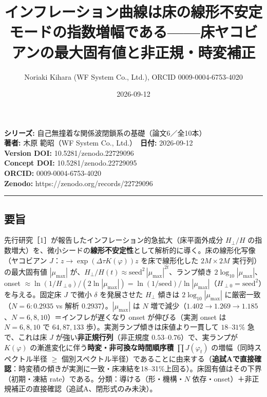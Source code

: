 \documentclass[
  a4paper,
]{ltjsarticle}
\title{インフレーション曲線は床の線形不安定モードの指数増幅である------床ヤコビアンの最大固有値と非正規・時変補正}
\author{Noriaki Kihara (WF System Co., Ltd.), ORCID 0009-0004-6753-4020}
\date{2026-09-12}
\begin{document}
\maketitle

\textbf{シリーズ:} 自己無撞着な関係波閉鎖系の基礎（論文6／全10本）\\
\textbf{著者:} 木原 範昭（WF System Co., Ltd.）　\textbf{日付:}
2026-09-12\\
\textbf{Version DOI:} 10.5281/zenodo.22729096\\
\textbf{Concept DOI:} 10.5281/zenodo.22729095\\
\textbf{ORCID:} 0009-0004-6753-4020\\
\textbf{Zenodo:} https://zenodo.org/records/22729096\\

\begin{center}\rule{0.5\linewidth}{0.5pt}\end{center}

\subsection{要旨}\label{ux8981ux65e8}

先行研究［1］が報告したインフレーション的急拡大（床平面外成分
\(H_\perp/H\)
の指数増大）を、微小シードの\textbf{線形不安定性}として解析的に導く。床の線形化写像（ヤコビアン
\(J\)：\(z\to\exp(\Delta\tau K(\varphi))z\) を床で線形化した
\(2M\times2M\) 実行列）の最大固有値 \(|\mu_{\max}|\)
が、\(H_\perp/H(t)\approx\text{seed}^2\,|\mu_{\max}|^{2t}\)、ランプ傾き
\(2\log_{10}|\mu_{\max}|\)、onset
\(\approx\ln(1/H_{\perp0})/(2\ln|\mu_{\max}|)=\ln(1/\text{seed})/\ln|\mu_{\max}|\)（\(H_{\perp0}=\text{seed}^2\)）を与える。固定床
\(J\) で微小 \(\delta\) を発展させた \(H_\perp\) 傾きは
\(2\log_{10}|\mu_{\max}|\) に厳密一致（\(N=6{:}0.2935\) vs 解析
\(0.2937\)）。\(|\mu_{\max}|\) は \(N\)
増で減少（\(1.402\to1.269\to1.185\)、\(N=6,8,10\)）＝インフレが遅くなり
onset が伸びる（実測 onset は \(N=6,8,10\) で \(64,87,133\)
歩）。実測ランプ傾きは床値より一貫して \(18\)--\(31\%\) 急で、これは床
\(J\) が強い\textbf{非正規行列}（非正規度
\(0.53\)--\(0.76\)）で、実ランプが \(K(\varphi)\)
の漸進変化に伴う\textbf{時変・非可換な時間順序積} \(\prod J(\varphi_t)\)
の増幅（同時スペクトル半径 \(\ge\)
個別スペクトル半径）であることに由来する（\textbf{追試Aで直接確認}：時変積の傾きが実測に一致・床凍結を18--31\%上回る）。床固有値はその下界（初期・凍結
rate）である。分類：導ける（形・機構・\(N\)
依存・onset）＋非正規補正の直接確認（追試A、閉形式のみ未決）。
\end{document}
